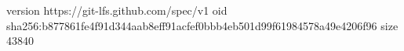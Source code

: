 version https://git-lfs.github.com/spec/v1
oid sha256:b877861fe4f91d344aab8eff91acfef0bbb4eb501d99f61984578a49e4206f96
size 43840
